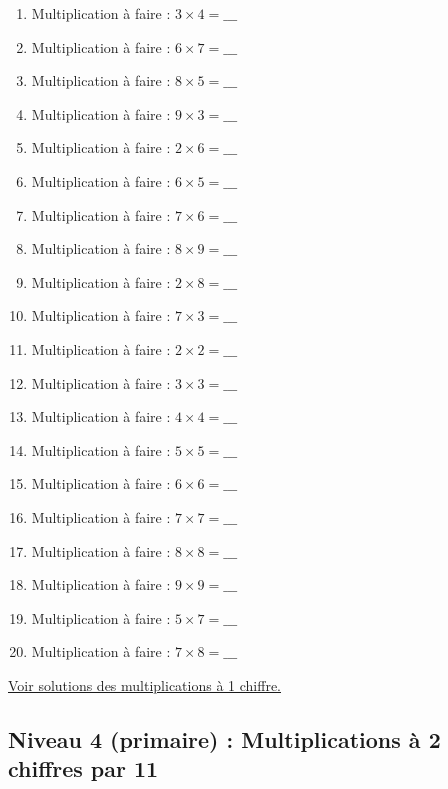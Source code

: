 \documentclass[11pt]{article}
\begin{document}
\begin{enumerate}
\item Multiplication à faire :  \(3\times 4 = \_\_\_\)
\item Multiplication à faire :  \(6\times 7 = \_\_\_\)
\item Multiplication à faire :  \(8\times 5 = \_\_\_\)
\item Multiplication à faire :  \(9\times 3 = \_\_\_\)
\item Multiplication à faire :  \(2\times 6 = \_\_\_\)
\item Multiplication à faire :  \(6\times 5 = \_\_\_\)
\item Multiplication à faire :  \(7\times 6 = \_\_\_\)
\item Multiplication à faire :  \(8\times 9 = \_\_\_\)
\item Multiplication à faire :  \(2\times 8 = \_\_\_\)
\item Multiplication à faire :  \(7\times 3 = \_\_\_\)
\item Multiplication à faire :  \(2\times 2 = \_\_\_\)
\item Multiplication à faire :  \(3\times 3 = \_\_\_\)
\item Multiplication à faire :  \(4\times 4 = \_\_\_\)
\item Multiplication à faire :  \(5\times 5 = \_\_\_\)
\item Multiplication à faire :  \(6\times 6 = \_\_\_\)
\item Multiplication à faire :  \(7\times 7 = \_\_\_\)
\item Multiplication à faire :  \(8\times 8 = \_\_\_\)
\item Multiplication à faire :  \(9\times 9 = \_\_\_\)
\item Multiplication à faire :  \(5\times 7 = \_\_\_\)
\item Multiplication à faire :  \(7\times 8 = \_\_\_\)
\end{enumerate}




\hyperref[org14f83f5]{Voir solutions des multiplications à 1 chiffre.}




\newpage

\subsection{Niveau 4 (primaire) : Multiplications à 2 chiffres par 11}
\label{sec:orga07bd71}
\label{org08e1fa7}
\end{document}
